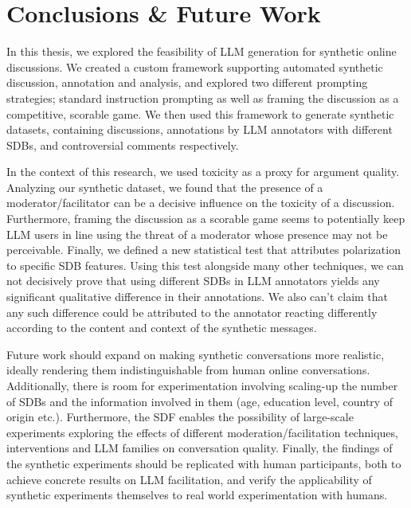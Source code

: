 %
\chapter{Conclusions \& Future Work}
\label{sec:conclusions}

In this thesis, we explored the feasibility of LLM generation for synthetic online discussions. We created a custom framework supporting automated synthetic discussion, annotation and analysis, and explored two different prompting strategies; standard instruction prompting as well as framing the discussion as a competitive, scorable game. We then used this framework to generate synthetic datasets, containing discussions, annotations by LLM annotators with different \acp{SDB}, and controversial comments respectively. 

In the context of this research, we used toxicity as a proxy for argument quality. Analyzing our synthetic dataset, we found that the presence of a moderator/facilitator can be a decisive influence on the toxicity of a discussion. Furthermore, framing the discussion as a scorable game seems to potentially keep LLM users in line using the threat of a moderator whose presence may not be perceivable. Finally, we defined a new statistical test that attributes polarization to specific \ac{SDB} features. Using this test alongside many other techniques, we can not decisively prove that using different \acp{SDB} in LLM annotators yields any significant qualitative difference in their annotations. We also can't claim that any such difference could be attributed to the annotator reacting differently according to the content and context of the synthetic messages.

Future work should expand on making synthetic conversations more realistic, ideally rendering them indistinguishable from human online conversations. Additionally, there is room for experimentation involving scaling-up the number of \acp{SDB} and the information involved in them (age, education level, country of origin etc.). Furthermore, the \ac{SDF} enables the possibility of large-scale experiments exploring the effects of different moderation/facilitation techniques, interventions and LLM families on conversation quality. Finally, the findings of the synthetic experiments should be replicated with human participants, both to achieve concrete results on LLM facilitation, and verify the applicability of synthetic experiments themselves to real world experimentation with humans.